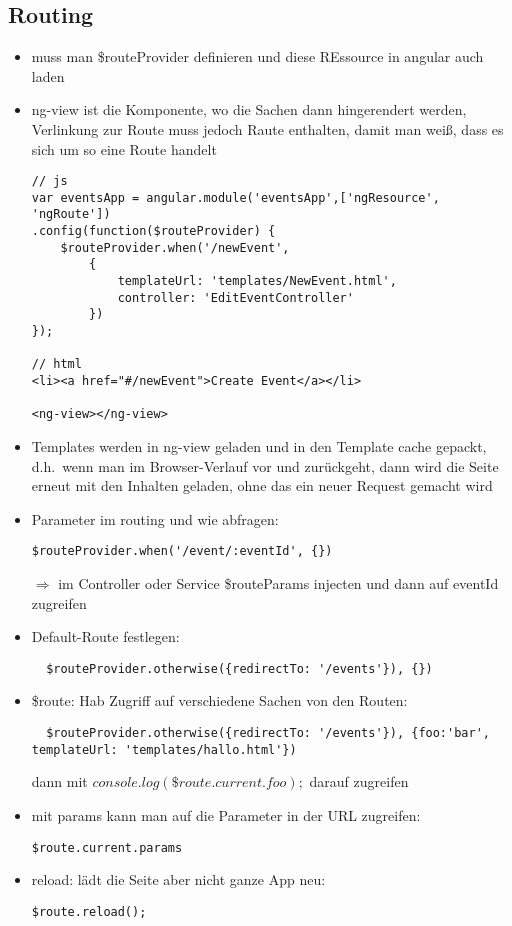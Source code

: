 \subsection{Routing}
\begin{itemize}
  \item muss man \$routeProvider definieren und diese REssource in angular auch laden
  \item ng-view ist die Komponente, wo die Sachen dann hingerendert werden, Verlinkung zur Route
    muss jedoch Raute enthalten, damit man weiß, dass es sich um so eine Route handelt
\begin{verbatim}
// js
var eventsApp = angular.module('eventsApp',['ngResource', 'ngRoute'])
.config(function($routeProvider) {
    $routeProvider.when('/newEvent',
        {
            templateUrl: 'templates/NewEvent.html',
            controller: 'EditEventController'
        })
});

// html
<li><a href="#/newEvent">Create Event</a></li>

<ng-view></ng-view>

\end{verbatim}

  \item Templates werden in ng-view geladen und in den Template cache gepackt, d.h.\ wenn man im
    Browser-Verlauf vor und zurückgeht, dann wird die Seite erneut mit den Inhalten geladen, ohne
    das ein neuer Request gemacht wird
  \item Parameter im routing und wie abfragen:
\begin{verbatim}
$routeProvider.when('/event/:eventId', {})
\end{verbatim}

$\Rightarrow$  im Controller oder Service \$routeParams injecten und dann auf eventId zugreifen
  \item Default-Route festlegen:
\begin{verbatim}
  $routeProvider.otherwise({redirectTo: '/events'}), {})
\end{verbatim}
  \item \$route: Hab Zugriff auf verschiedene Sachen von den Routen:
\begin{verbatim}
  $routeProvider.otherwise({redirectTo: '/events'}), {foo:'bar', templateUrl: 'templates/hallo.html'})
\end{verbatim}
dann mit $console.log(\$route.current.foo);$ darauf zugreifen
  \item mit params kann man auf die Parameter in der URL zugreifen:
\begin{verbatim}
$route.current.params
\end{verbatim}
  \item reload: lädt die Seite aber nicht ganze App neu:
    \begin{verbatim}
$route.reload();
    \end{verbatim}
\end{itemize}


